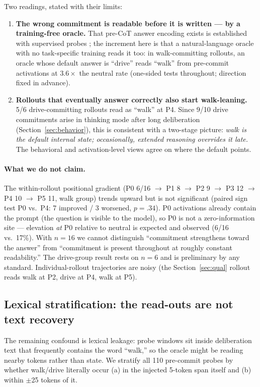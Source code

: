 \documentclass[11pt]{article}
\begin{document}
Two readings, stated with their limits:
\begin{enumerate}
\item \textbf{The wrong commitment is readable before it is written ---
by a training-free oracle.} That pre-CoT answer encoding exists is
established with supervised probes \citep{cox}; the increment here is
that a natural-language oracle with no task-specific training reads it
too: in walk-committing rollouts, an oracle whose default answer is
``drive'' reads ``walk'' from pre-commit activations at $3.6\times$ the
neutral rate (one-sided tests throughout; direction fixed in advance).
\item \textbf{Rollouts that eventually answer correctly also start
walk-leaning.} 5/6 drive-committing rollouts read as ``walk'' at P4.
Since 9/10 drive commitments arise in thinking mode after long
deliberation (Section~\ref{sec:behavior}), this is consistent with a
two-stage picture: \emph{walk is the default internal state;
occasionally, extended reasoning overrides it late.} The behavioral and
activation-level views agree on where the default points.
\end{enumerate}

\paragraph{What we do not claim.} The within-rollout positional gradient
(P0 6/16 $\rightarrow$ P1 8 $\rightarrow$ P2 9 $\rightarrow$ P3 12
$\rightarrow$ P4 10 $\rightarrow$ P5 11, walk group) trends upward but is
not significant (paired sign test P0 vs.\ P4: 7 improved / 3 worsened,
$p = .34$). P0 activations already contain the prompt (the question is
visible to the model), so P0 is not a zero-information site --- elevation
\emph{at} P0 relative to neutral is expected and observed (6/16 vs.\
17\%). With $n=16$ we cannot distinguish ``commitment strengthens toward
the answer'' from ``commitment is present throughout at roughly constant
readability.'' The drive-group result rests on $n=6$ and is preliminary by
any standard. Individual-rollout trajectories are noisy (the
Section~\ref{sec:qual} rollout reads walk at P2, drive at P4, walk at P5).

\subsection{Lexical stratification: the read-outs are not text recovery}
\label{sec:lexical}

The remaining confound is lexical leakage: probe windows sit inside
deliberation text that frequently contains the word ``walk,'' so the
oracle might be reading nearby tokens rather than state. We stratify all
110 pre-commit probes by whether walk/drive literally occur (a) in the
injected 5-token span itself and (b) within $\pm$25 tokens of it.
\end{document}
